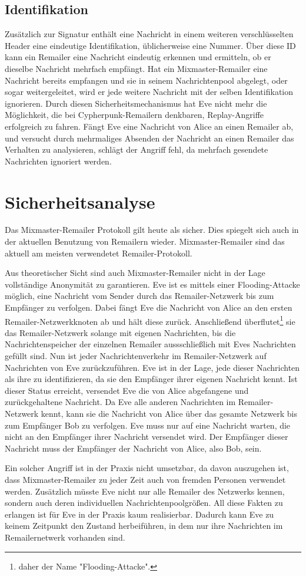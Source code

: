 \subsection{Identifikation}
Zusätzlich zur Signatur enthält eine Nachricht in einem weiteren verschlüsselten Header eine eindeutige Identifikation, üblicherweise eine Nummer. Über diese ID kann ein Remailer eine Nachricht eindeutig erkennen und ermitteln, ob er dieselbe Nachricht mehrfach empfängt. Hat ein Mixmaster-Remailer eine Nachricht bereits empfangen und sie in seinem Nachrichtenpool abgelegt, oder sogar weitergeleitet, wird er jede weitere Nachricht mit der selben Identifikation ignorieren. Durch diesen Sicherheitsmechanismus hat Eve nicht mehr die Möglichkeit, die bei Cypherpunk-Remailern denkbaren, Replay-Angriffe erfolgreich zu fahren. Fängt Eve eine Nachricht von Alice an einen Remailer ab, und versucht durch mehrmaliges Absenden der Nachricht an einen Remailer das Verhalten zu analysieren, schlägt der Angriff fehl, da mehrfach gesendete Nachrichten ignoriert werden.

\section{Sicherheitsanalyse}
Das Mixmaster-Remailer Protokoll gilt heute als sicher. Dies spiegelt sich auch in der aktuellen Benutzung von Remailern wieder. Mixmaster-Remailer sind das aktuell am meisten verwendetet Remailer-Protokoll.

Aus theoretischer Sicht sind auch Mixmaster-Remailer nicht in der Lage vollständige Anonymität zu garantieren. Eve ist es mittels einer Flooding-Attacke möglich, eine Nachricht vom Sender durch das Remailer-Netzwerk bis zum Empfänger zu verfolgen. Dabei fängt Eve die Nachricht von Alice an den ersten Remailer-Netzwerkknoten ab und hält diese zurück. Anschließend überflutet\footnote{daher der Name "Flooding-Attacke".} sie das Remailer-Netzwerk solange mit eigenen Nachrichten, bis die Nachrichtenspeicher der einzelnen Remailer aussschließlich mit Eves Nachrichten gefüllt sind. Nun ist jeder Nachrichtenverkehr im Remailer-Netzwerk auf Nachrichten von Eve zurückzuführen. Eve ist in der Lage, jede dieser Nachrichten als ihre zu identifizieren, da sie den Empfänger ihrer eigenen Nachricht kennt. Ist dieser Status erreicht, versendet Eve die von Alice abgefangene und zurückgehaltene Nachricht. Da Eve alle anderen Nachrichten im Remailer-Netzwerk kennt, kann sie die Nachricht von Alice über das gesamte Netzwerk bis zum Empfänger Bob zu verfolgen. Eve muss nur auf eine Nachricht warten, die nicht an den Empfänger ihrer Nachricht versendet wird. Der Empfänger dieser Nachricht muss der Empfänger der Nachricht von Alice, also Bob, sein.

Ein solcher Angriff ist in der Praxis nicht umsetzbar, da davon auszugehen ist, dass Mixmaster-Remailer zu jeder Zeit auch von fremden Personen verwendet werden. Zusätzlich müsste Eve nicht nur alle Remailer des Netzwerks kennen, sondern auch deren individuellen Nachrichtenpoolgrößen. All diese Fakten zu erlangen ist für Eve in der Praxis kaum realisierbar. Dadurch kann Eve zu keinem Zeitpunkt den Zustand herbeiführen, in dem nur ihre Nachrichten im Remailernetwerk vorhanden sind.